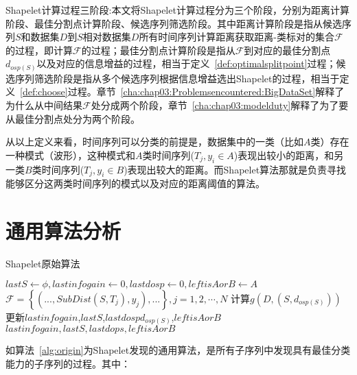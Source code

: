 \begin{definition}
	\label{def:chap03:Threephases}
	Shapelet计算过程三阶段:本文将Shapelet计算过程分为三个阶段，分别为距离计算阶段、最佳分割点计算阶段、候选序列筛选阶段。其中距离计算阶段是指从候选序列$S$和数据集$D$到$S$相对数据集$D$所有时间序列计算距离获取距离-类标对的集合$\mathcal{F}$的过程，即计算$\mathcal{F}$的过程；最佳分割点计算阶段是指从$\mathcal{F}$到对应的最佳分割点$d_{osp(S)}$以及对应的信息增益的过程，相当于定义~\ref{def:optimalsplitpoint}过程；候选序列筛选阶段是指从多个候选序列根据信息增益选出Shapelet的过程，相当于定义~\ref{def:choose}过程。章节~\ref{cha:chap03:Problemsencountered:BigDataSet}解释了为什么从中间结果$\mathcal{F}$处分成两个阶段，章节~\ref{cha:chap03:modelduty}解释了为了要从最佳分割点处分为两个阶段。
\end{definition}

从以上定义来看，时间序列可以分类的前提是，数据集中的一类（比如$A$类）存在一种模式（波形），这种模式和$A$类时间序列($T_j,y_i\in A$)表现出较小的距离，和另一类$B$类时间序列($T_j,y_i\in B$)表现出较大的距离。而Shapelet算法那就是负责寻找能够区分这两类时间序列的模式以及对应的距离阈值的算法。%

\section{通用算法分析}
\label{cha:chap02:generalalganalysis}
\begin{algorithm}
	\caption{Shapelet原始算法}
	\label{alg:origin}
	\begin{algorithmic}[1]
			\State $lastS \gets \phi, lastinfogain \gets 0, lastdosp \gets 0, leftisAorB\gets A$ 
			 \label{Code:Set}
				\State $\mathcal{F} = \left\lbrace (...,SubDist(S,T_j),y_j),...\right\rbrace,j = 1,2,\cdots,N$ \label{Code:calcSubDist}
				\State 计算$g(D,(S,d_{osp(S)}))$ \label{Code:infogain}
					\State 更新$lastinfogain$,$lastS$,$lastdospd_{osp(S)}$,$leftisAorB$
				\EndIf
			\EndFor
			\State \Return $lastinfogain,lastS,lastdops,leftisAorB$
		\EndFunction
	\end{algorithmic}
\end{algorithm}

如算法~\ref{alg:origin}为Shapelet发现的通用算法，是所有子序列中发现具有最佳分类能力的子序列的过程。其中：

